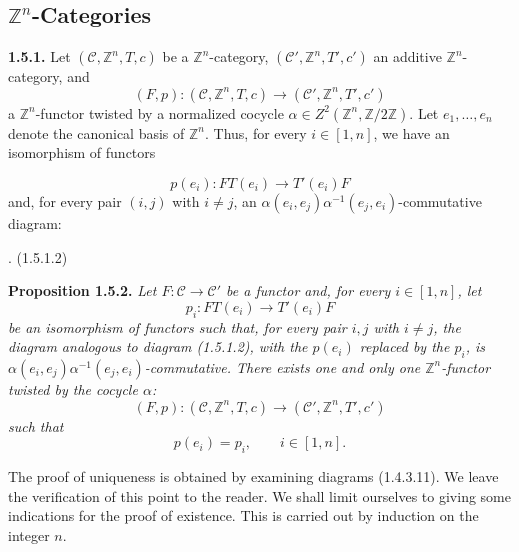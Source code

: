 %
\subsection{\texorpdfstring{$\mathbb Z^n$}{Z n}-Categories}

\noindent\textbf{1.5.1.}\quad
Let $(\mathcal C,\mathbb Z^n,T,c)$ be a $\mathbb Z^n$-category,
$(\mathcal C',\mathbb Z^n,T',c')$ an additive
$\mathbb Z^n$-category, and
\[
  (F,p)\colon(\mathcal C,\mathbb Z^n,T,c)
  \longrightarrow(\mathcal C',\mathbb Z^n,T',c')
\]
a $\mathbb Z^n$-functor twisted by a normalized cocycle
$\alpha\in Z^2(\mathbb Z^n,\mathbb Z/2\mathbb Z)$. Let
$e_1,\ldots,e_n$ denote the canonical basis of $\mathbb Z^n$. Thus,
for every $i\in[1,n]$, we have an isomorphism of functors

\begin{equation}
  p(e_i)\colon FT(e_i)\longrightarrow T'(e_i)F
  \tag{1.5.1.1}
\end{equation}
and, for every pair $(i,j)$ with $i\ne j$, an
$\alpha(e_i,e_j)\alpha^{-1}(e_j,e_i)$-commutative diagram:

\begin{center}
  \;.
  \hfill\textup{(1.5.1.2)}
\end{center}

\noindent\textbf{Proposition 1.5.2.}\quad
\emph{Let $F\colon\mathcal C\to\mathcal C'$ be a functor and, for
every $i\in[1,n]$, let
\[
  p_i\colon FT(e_i)\longrightarrow T'(e_i)F
\]
be an isomorphism of functors such that, for every pair $i,j$ with
$i\ne j$, the diagram analogous to diagram (1.5.1.2), with the
$p(e_i)$ replaced by the $p_i$, is
$\alpha(e_i,e_j)\alpha^{-1}(e_j,e_i)$-commutative. There exists one
and only one $\mathbb Z^n$-functor twisted by the cocycle $\alpha$:
\[
  (F,p)\colon(\mathcal C,\mathbb Z^n,T,c)
  \longrightarrow(\mathcal C',\mathbb Z^n,T',c')
\]
such that
\[
  p(e_i)=p_i,
  \qquad i\in[1,n].
\]}

The proof of uniqueness is obtained by examining diagrams (1.4.3.11).
We leave the verification of this point to the reader. We shall limit
ourselves to giving some indications for the proof of existence. This
is carried out by induction on the integer $n$.
